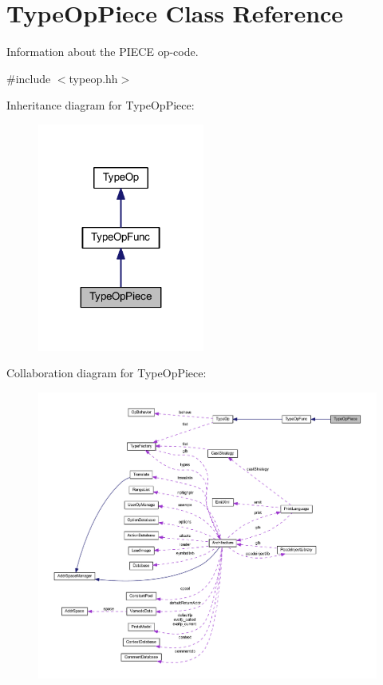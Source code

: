 \hypertarget{class_type_op_piece}{}\section{Type\+Op\+Piece Class Reference}
\label{class_type_op_piece}


Information about the P\+I\+E\+CE op-\/code.  




{\ttfamily \#include $<$typeop.\+hh$>$}



Inheritance diagram for Type\+Op\+Piece\+:
\nopagebreak
\begin{figure}[H]
\begin{center}
\leavevmode
\includegraphics[width=155pt]{class_type_op_piece__inherit__graph}
\end{center}
\end{figure}


Collaboration diagram for Type\+Op\+Piece\+:
\nopagebreak
\begin{figure}[H]
\begin{center}
\leavevmode
\includegraphics[width=350pt]{class_type_op_piece__coll__graph}
\end{center}
\end{figure}
